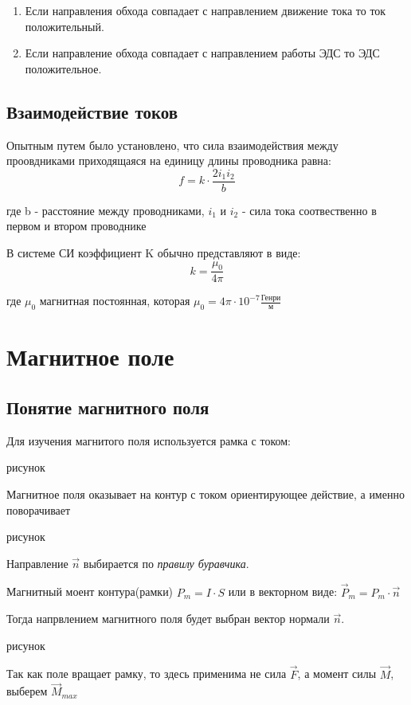 \documentclass[../main.tex]{subfiles}
\begin{document}
\begin{enumerate}
    \item Если направления обхода совпадает с направлением движение тока то ток положительный. 
    \item Если направление обхода совпадает с направлением работы ЭДС то ЭДС положительное.
\end{enumerate}

\subsection{Взаимодействие токов}

Опытным путем было установлено, что сила взаимодействия между проовдниками приходящаяся на единицу длины проводника равна:
\[f = k \cdot \frac{2 i_1 i_2}{b}\]
\begin{center}
    где b - расстояние между проводниками, $i_1$ и $i_2$ - сила тока соотвественно в первом и втором проводнике
\end{center}

В системе СИ коэффициент K обычно представляют в виде:
\[k = \frac{\mu_0}{4 \pi}\]
\begin{center}
    где $\mu_0$ магнитная постоянная, которая $\mu_0 = 4\pi \cdot 10^{-7} \frac{\text{Генри}}{\text{м}}$
\end{center}

\section{Магнитное поле}
\subsection{Понятие магнитного поля}
Для изучения магнитого поля используется рамка с током:

рисунок

Магнитное поля оказывает на контур с током ориентирующее действие, а именно поворачивает

рисунок

Направление $\vec n$ выбирается по \textit{правилу буравчика}.

 Магнитный моент контура(рамки) $P_m = I \cdot S$ или в векторном виде: $\vec P_m = P_m \cdot \vec n$

Тогда напрвлением магнитного поля будет выбран вектор нормали $\vec n$.

рисунок

Так как поле вращает рамку, то здесь применима не сила $\vec F$, а момент силы $\vec M$, выберем $\vec M_{max}$
\end{document}
